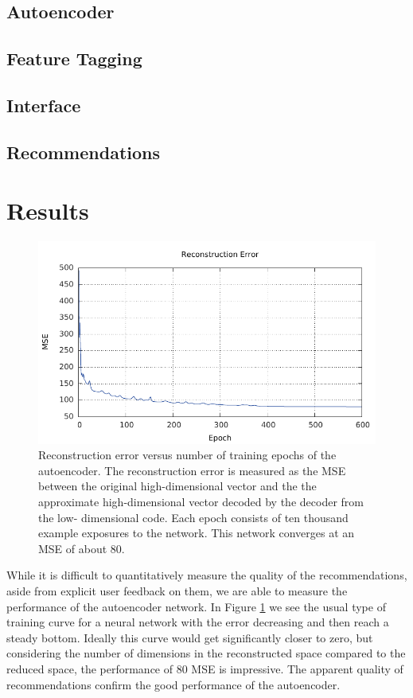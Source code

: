 \documentclass[conference]{IEEEtran}
\begin{document}
\subsection{Autoencoder}

\subsection{Feature Tagging}

\subsection{Interface}

\subsection{Recommendations}


\section{Results} \begin{figure} \centering
\includegraphics[width=\linewidth]{error.pdf} 
\caption{ Reconstruction error versus number of training epochs of the
autoencoder. The reconstruction error is measured as the MSE between the
original high-dimensional vector and the the approximate high-dimensional
vector decoded by the decoder from the low- dimensional code. Each epoch
consists of ten thousand example exposures to the network. This network
converges at an MSE of about 80.}
\label{error} 
\end{figure}

While it is difficult to quantitatively measure the quality of the
recommendations, aside from explicit user feedback on them, we are able to
measure the performance of the autoencoder network. In Figure \ref{error} we
see the usual type of training curve for a neural network with the error
decreasing and then reach a steady bottom. Ideally this curve would get
significantly closer to zero, but considering the number of dimensions in the
reconstructed space compared to the reduced space, the performance of 80 MSE
is impressive. The apparent quality of recommendations confirm the good performance of the autoencoder.
\end{document}
